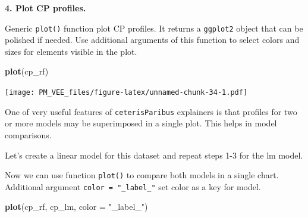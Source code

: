 \documentclass[]{krantz}
\newenvironment{Shaded}{\begin{snugshade}}{\end{snugshade}}
\newcommand{\DataTypeTok}[1]{\textcolor[rgb]{0.13,0.29,0.53}{#1}}
\newcommand{\KeywordTok}[1]{\textcolor[rgb]{0.13,0.29,0.53}{\textbf{#1}}}
\newcommand{\NormalTok}[1]{#1}
\newcommand{\OperatorTok}[1]{\textcolor[rgb]{0.81,0.36,0.00}{\textbf{#1}}}
\newcommand{\StringTok}[1]{\textcolor[rgb]{0.31,0.60,0.02}{#1}}
\theoremstyle{definition}
\theoremstyle{definition}
\theoremstyle{definition}
\theoremstyle{remark}
\begin{document}
\textbf{4. Plot CP profiles.}

Generic \texttt{plot()} function plot CP profiles. It returns a
\texttt{ggplot2} object that can be polished if needed. Use additional
arguments of this function to select colors and sizes for elements
visible in the plot.

\begin{Shaded}
\begin{Highlighting}[]
\KeywordTok{plot}\NormalTok{(cp_rf) }
\end{Highlighting}
\end{Shaded}

\texttt{[image: PM\_VEE\_files/figure-latex/unnamed-chunk-34-1.pdf]}

One of very useful features of \texttt{ceterisParibus} explainers is
that profiles for two or more models may be superimposed in a single
plot. This helps in model comparisons.

Let's create a linear model for this dataset and repeat steps 1-3 for
the lm model.

\begin{Shaded}
\end{Shaded}

Now we can use function \texttt{plot()} to compare both models in a
single chart. Additional argument \texttt{color\ =\ "\_label\_"} set
color as a key for model.

\begin{Shaded}
\begin{Highlighting}[]
\KeywordTok{plot}\NormalTok{(cp_rf, cp_lm, }\DataTypeTok{color =} \StringTok{"_label_"}\NormalTok{)}
\end{Highlighting}
\end{Shaded}
\end{document}
